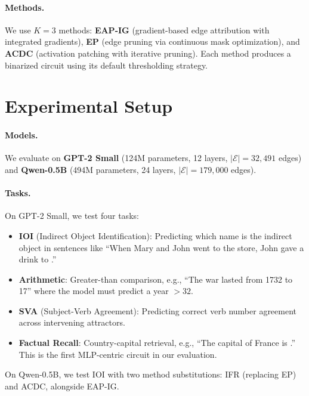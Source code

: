 \documentclass[11pt,a4paper]{article}
\begin{document}
\paragraph{Methods.}
We use $K{=}3$ methods: \textbf{EAP-IG} (gradient-based edge attribution with integrated gradients), \textbf{EP} (edge pruning via continuous mask optimization), and \textbf{ACDC} (activation patching with iterative pruning). Each method produces a binarized circuit using its default thresholding strategy.

\section{Experimental Setup}
\label{sec:setup}

\paragraph{Models.}
We evaluate on \textbf{GPT-2 Small} (124M parameters, 12 layers, $|\mathcal{E}|{=}32{,}491$ edges) and \textbf{Qwen-0.5B} (494M parameters, 24 layers, $|\mathcal{E}|{=}179{,}000$ edges).

\paragraph{Tasks.}
On GPT-2 Small, we test four tasks:
\begin{itemize}
    \item \textbf{IOI} (Indirect Object Identification): Predicting which name is the indirect object in sentences like ``When Mary and John went to the store, John gave a drink to \underline{\hspace{0.5cm}}.''
    \item \textbf{Arithmetic}: Greater-than comparison, e.g., ``The war lasted from 1732 to 17\underline{\hspace{0.3cm}}'' where the model must predict a year $> 32$.
    \item \textbf{SVA} (Subject-Verb Agreement): Predicting correct verb number agreement across intervening attractors.
    \item \textbf{Factual Recall}: Country-capital retrieval, e.g., ``The capital of France is \underline{\hspace{0.5cm}}.'' This is the first MLP-centric circuit in our evaluation.
\end{itemize}
On Qwen-0.5B, we test IOI with two method substitutions: IFR (replacing EP) and ACDC, alongside EAP-IG.
\end{document}

